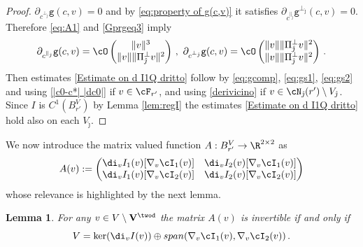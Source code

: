 \documentclass[11pt,a4paper,reqno]{article}
\numberwithin{equation}{section}
\newtheorem{lemma}[theorem]{Lemma}
\theoremstyle{definition}
\begin{document}
\begin{proof}
    $\partial_{c^{\bot_{\hat \jmath}}}{\mathtt g} (c,v)=0 $ and by \eqref{eq:property of g(c,v)} it satisfies $\partial_{c^{\parallel_{\hat \jmath}}}{\mathtt g}^{\bot_{\hat \jmath}} (c,v)=0$.
        Therefore  \eqref{eq:A1} and \eqref{Gprgeq3} imply
\begin{equation}\label{eq:gs2}
        \partial_{c^{\parallel_{\hat \jmath}}}{\mathtt g}(c,v)=\cO\begin{pmatrix}
            \|v\|^3\\
            \|v\|\|\Pi_{\hat \jmath}^\bot v\|^2
        \end{pmatrix} \, , \ 
        \partial_{c^{\bot_{\hat \jmath}}}{\mathtt g}(c,v)=\cO\begin{pmatrix}
            \|v\|\|\Pi_{\hat \jmath}^\bot v\|^2\\
            \|v\|\|\Pi_{\hat \jmath}^\bot v\|^2
        \end{pmatrix} \, . 
\end{equation}
 Then estimates \eqref{Estimate on d I1Q dritto} follow by
  \eqref{eq:gcomp},
  \eqref{eq:gs1}, \eqref{eq:gs2} and using \eqref{|c0-c*| |dc0|} if $v\in \cF_{r'}$, and  using \eqref{derivicino} if $v\in \cN_{\hat \jmath}(r')\setminus V_{\hat \jmath}$.
  Since $ I $ is $ C^1 (B_{r'}^V ) $ by Lemma \ref{lem:regI} the estimates
  \eqref{Estimate on d I1Q dritto} hold
  also on 
  each $ V_{\hat \jmath }$. 
\end{proof}

We now introduce the matrix valued function $A :B_{r'}^V\to \R^{2\times 2} $ as
\begin{equation}\label{Def AA}
        A(v):= 
        \begin{pmatrix} 
            \di_vI_1 (v)[\nabla_v \cI_1 (v)] & \di_vI_2  (v)[\nabla_v \cI_1 (v)] \\
            \di_v I_1 (v)[\nabla_v \cI_2 (v)] & \di_vI_2 (v)[\nabla_v \cI_2 (v)]
        \end{pmatrix}  
    \end{equation} 
whose relevance is 
highlighted by the next lemma. 
    \begin{lemma}
    \label{lem:indip}
        For  any $v\in V\setminus {\bf V}^{\twod}$ the matrix $A(v)$ is invertible if and only if
\begin{equation}\label{eq:decomposition}
            V = \ker(\di_vI(v))\oplus span(\nabla_v \cI_1(v),\nabla_v \cI_2(v))\, .
        \end{equation}
    \end{lemma}
    
\end{document}
